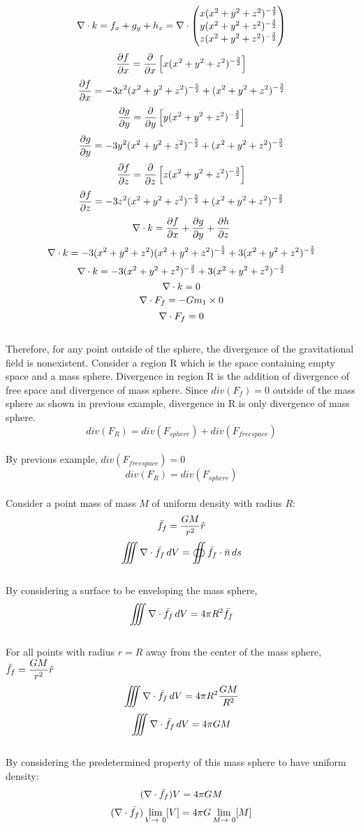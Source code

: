 \documentclass[class=report, 12pt, crop=false]{standalone}
\begin{document}
\begin{center}
$$\nabla \cdot \displaystyle{k  =f_x + g_y + h_z =   \nabla\cdot\begin{pmatrix} x(x^2+y^2+z^2)^{-\frac{3}{2}}\\y(x^2+y^2+z^2)^{-\frac{3}{2}} \\z(x^2+y^2+z^2)^{-\frac{3}{2}} \end{pmatrix}}$$
$$\frac{\partial{f}}{\partial{x}}= \frac{\partial}{\partial{x}}\left[x(x^2+y^2+z^2)^{-\frac{3}{2}}\right]$$
$$\frac{\partial{f}}{\partial{x}}=-3x^2(x^2 +y ^2 + z^2)^{-\frac{5}{2}}+(x^2 + y^2 + z^2)^{-\frac{3}{2}}$$
$$\frac{\partial{g}}{\partial{y}}= \frac{\partial}{\partial{y}}\left[y(x^2+y^2+z^2)^{-\frac{3}{2}}\right]$$
$$\frac{\partial{g}}{\partial{y}}=-3y^2(x^2 +y ^2 + z^2)^{-\frac{5}{2}}+(x^2 + y^2 + z^2)^{-\frac{3}{2}}$$
$$\frac{\partial{f}}{\partial{z}}= \frac{\partial}{\partial{z}}\left[z(x^2+y^2+z^2)^{-\frac{3}{2}}\right]$$
$$\frac{\partial{f}}{\partial{z}}=-3z^2(x^2 +y ^2 + z^2)^{-\frac{5}{2}}+(x^2 + y^2 + z^2)^{-\frac{3}{2}}$$
$$\nabla \cdot k= \frac{\partial{f}}{\partial{x}} + \frac{\partial{g}}{\partial{y}} + \frac{\partial{h}}{\partial{z}}$$
$$\nabla \cdot k= -3(x^2 + y^2 + z^2)(x^2 +y ^2 + z^2)^{-\frac{5}{2}}+3(x^2 + y^2 + z^2)^{-\frac{3}{2}}$$
$$\nabla \cdot k= -3(x^2 +y ^2 + z^2)^{-\frac{3}{2}}+3(x^2 + y^2 + z^2)^{-\frac{3}{2}}$$
$$\nabla \cdot k= 0$$
$$\nabla \cdot F_f = -Gm_1 \times 0$$
$$\nabla \cdot F_f = 0$$
\\Therefore, for any point outside of the sphere, the divergence of the gravitational field is nonexistent.
Consider a region R which is the space containing empty space and a mass sphere. Divergence in region R is the addition of divergence of free space and divergence of mass sphere. Since $div(F_f) = 0$ outside of the mass sphere as shown in previous example, divergence in R is only divergence of mass sphere. 
$$div(F_{R}) = div(F_{sphere}) + div(F_{free space})$$
\\By previous example, $div(F_{free space}) = 0$
$$div(F_{R}) = div(F_{sphere})$$
\\Consider a point mass of mass $M$ of uniform density with radius $R$:
$$\bar{f_f} = \frac{GM}{r^2}\hat{r}$$
$$\displaystyle{\iiint \nabla\cdot\bar{f_f} \,dV =  \oiint {\bar{f_f} \cdot\bar{n}}\,ds }$$
\\By considering a surface to be enveloping the mass sphere,
$$\displaystyle{\iiint \nabla\cdot\bar{f_f} \,dV =  4 \pi R^2\bar{f_f} }$$
\\For all points with radius $r = R$ away from the center of the mass sphere, $\displaystyle{\bar{f_f} = \frac{GM}{r^2}\hat{r}}$
$$\iiint \nabla \cdot \bar{f_f} \,dV =  4 \pi R^2\frac{GM}{R^2}$$
$$\iiint \nabla \cdot \bar{f_f} \,dV =  4 \pi GM$$
\\By considering the predetermined property of this mass sphere to have uniform density:
$$(\nabla \cdot \bar{f_f}) V =  4 \pi GM$$
$$(\nabla \cdot \bar{f_f}) \lim_{V\to\ 0} [V] =  4 \pi G \lim_{M\to\ 0} [M]$$

\end{center}
\end{document}
